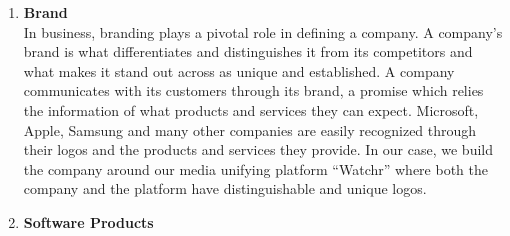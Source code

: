 \begin{enumerate}
  \item \textbf{Brand}\\
In business, branding plays a pivotal role in defining a company. A company's brand is what differentiates and distinguishes it from its competitors and what makes it stand out across as unique and established. 
A company communicates with its customers through its brand, a promise which relies the information of what products and services they can expect. Microsoft, Apple, Samsung and many other companies are easily recognized through their logos and the products and services they provide. In our case, we build the company around our media unifying platform ``Watchr'' where both the company and the platform have distinguishable and unique logos.

  \item \textbf{Software Products}
  

\end{enumerate}
